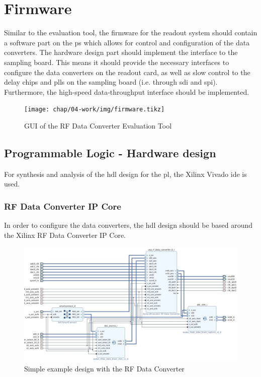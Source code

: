\section{Firmware}\label{sec:firmware}
Similar to the evaluation tool, the firmware for the readout system should contain a software part on the \gls{ps} which allows for control and configuration of the data converters. 
The hardware design part should implement the interface to the sampling board. 
This means it should provide the necessary interfaces to configure the data converters on the readout card, as well as slow control to the delay chips and \glspl{pll} on the sampling board (i.e. through \gls{sdi} and \gls{spi}). 
Furthermore, the high-speed data-throughput interface should be implemented.


\begin{figure}[tbh]
	\centering
	\texttt{[image: chap/04-work/img/firmware.tikz]}
	\caption{GUI of the RF Data Converter Evaluation Tool}
	\label{fig:firmware}
\end{figure}


\subsection{Programmable Logic - Hardware design}
For synthesis and analysis of the \gls{hdl} design for the \gls{pl}, the Xilinx Vivado \gls{ide} is used.

\subsubsection*{RF Data Converter IP Core}
In order to configure the data converters, the \gls{hdl} design should be based around the Xilinx RF Data Converter IP Core. 

\begin{figure}[tbh]
	\centering
	\includegraphics[width = \textwidth]{chap/04-work/img/rf_data_converter}
	\caption{Simple example design with the RF Data Converter}
	\label{fig:rf_dc_ex}
\end{figure}

